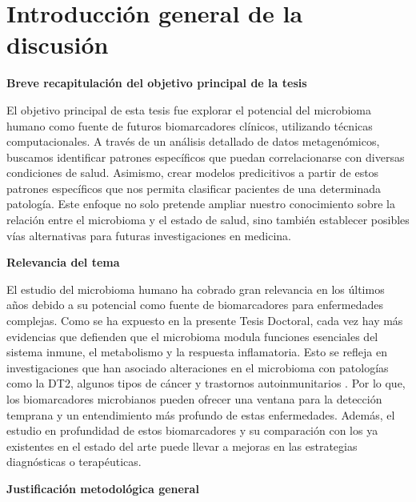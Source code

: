 \section{Introducción general de la discusión}

\textbf{Breve recapitulación del objetivo principal de la tesis}

El objetivo principal de esta tesis fue explorar el potencial del microbioma humano como fuente de futuros biomarcadores clínicos, utilizando técnicas computacionales. A través de un análisis detallado de datos metagenómicos, buscamos identificar patrones específicos que puedan correlacionarse con diversas condiciones de salud. Asimismo, crear modelos predicitivos a partir de estos patrones específicos que nos permita clasificar pacientes de una determinada patología. Este enfoque no solo pretende ampliar nuestro conocimiento sobre la relación entre el microbioma y el estado de salud, sino también establecer posibles vías alternativas para futuras investigaciones en medicina.

\textbf{Relevancia del tema}

El estudio del microbioma humano ha cobrado gran relevancia en los últimos años debido a su potencial como fuente de biomarcadores para enfermedades complejas. Como se ha expuesto en la presente Tesis Doctoral, cada vez hay más evidencias que defienden que el microbioma modula funciones esenciales del sistema inmune, el metabolismo y la respuesta inflamatoria. Esto se refleja en investigaciones que han asociado alteraciones en el microbioma con patologías como la DT2, algunos tipos de cáncer y trastornos autoinmunitarios \cite{schirmer2016linking, fan2021gut, bakir2022inflammatory}. Por lo que, los biomarcadores microbianos pueden ofrecer una ventana para la detección temprana y un entendimiento más profundo de estas enfermedades. Además, el estudio en profundidad de estos biomarcadores y su comparación con los ya existentes en el estado del arte puede llevar a mejoras en las estrategias diagnósticas o terapéuticas. 


\textbf{Justificación metodológica general}

